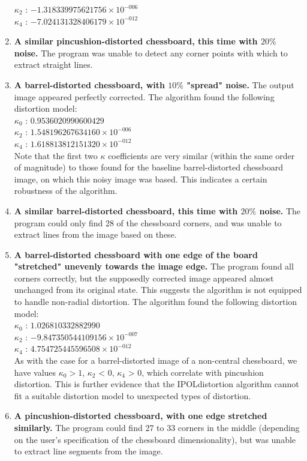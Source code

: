 \begin{enumerate}
   $ \kappa_{2}$ : $-1.318339975621756 \times 10^{-006}$\\
   $ \kappa_{4}$ : $-7.024131328406179 \times 10^{-012}$
  \item \textbf{A similar pincushion-distorted chessboard, this time with $20\%$ noise.} The program was unable to detect any corner points with which to extract straight lines.
  \item \textbf{A barrel-distorted chessboard, with $10\%$ "spread" noise.} The output image appeared perfectly corrected. The algorithm found the following distortion model:\\
   $ \kappa_{0}$ : $0.9536020990600429$\\
   $ \kappa_{2}$ : $1.548196267634160 \times 10^{-006}$\\
   $ \kappa_{4}$ : $1.618813812151320 \times 10^{-012}$\\
   Note that the first two $\kappa$ coefficients are very similar (within the same order of magnitude) to those found for the baseline barrel-distorted chessboard image, on which this noisy image was based. This indicates a certain robustness of the algorithm.
  \item \textbf{A similar barrel-distorted chessboard, this time with $20\%$ noise.} The program could only find 28 of the chessboard corners, and was unable to extract lines from the image based on these.
  \item \textbf{A barrel-distorted chessboard with one edge of the board "stretched" unevenly towards the image edge.} The program found all corners correctly, but the supposedly corrected image appeared almost unchanged from its original state. This suggests the algorithm is not equipped to handle non-radial distortion. The algorithm found the following distortion model:\\
   $ \kappa_{0}$ : $1.026810332882990$\\
   $ \kappa_{2}$ : $-9.847350544109156 \times 10^{-007}$\\
   $ \kappa_{4}$ : $4.754725445596508 \times 10^{-012}$\\
  As with the case for a barrel-distorted image of a non-central chessboard, we have values $\kappa_{0} > 1$, $\kappa_{2}$ < 0, $\kappa_{4}$ > 0, which correlate with pincushion distortion. This is further evidence that the IPOLdistortion algorithm cannot fit a suitable distortion model to unexpected types of distortion.
  \item \textbf{A pincushion-distorted chessboard, with one edge stretched similarly.} The program could find 27 to 33 corners in the middle (depending on the user's specification of the chessboard dimensionality), but was unable to extract line segments from the image.

\end{enumerate}
